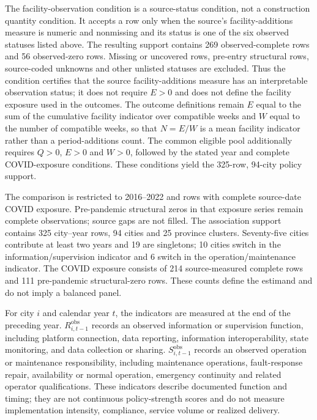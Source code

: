 The facility-observation condition is a source-status condition, not a
construction quantity condition.  It accepts a row only when the source's
facility-additions measure is numeric and nonmissing and its status is one of
the six observed statuses listed above.  The resulting support contains 269
observed-complete rows and 56 observed-zero rows.  Missing or uncovered rows,
pre-entry structural rows, source-coded unknowns and other unlisted statuses
are excluded.  Thus the condition certifies that the source facility-additions
measure has an interpretable observation status; it does not require $E>0$ and
does not define the facility exposure used in the outcomes.  The outcome
definitions remain $E$ equal to the sum of the cumulative facility indicator
over compatible weeks and $W$ equal to the number of compatible weeks, so that
$N=E/W$ is a mean facility indicator rather than a period-additions count.
The common eligible pool additionally requires $Q>0$, $E>0$ and $W>0$,
followed by the stated year and complete COVID-exposure conditions.  These
conditions yield the 325-row, 94-city policy support.

The comparison is restricted to 2016--2022 and rows with complete source-date
COVID exposure.  Pre-pandemic structural zeros in that exposure series remain
complete observations; source gaps are not filled.  The association support contains
325 city--year rows, 94 cities and 25 province clusters.  Seventy-five cities
contribute at least two years and 19 are singletons; 10 cities switch in the
information/supervision indicator and 6 switch in the operation/maintenance
indicator.  The COVID exposure consists of 214 source-measured complete rows and 111 pre-pandemic
structural-zero rows.  These counts define the estimand and do not imply a
balanced panel.

For city $i$ and calendar year $t$, the indicators are measured at the end of
the preceding year.  $R^{\mathrm{obs}}_{i,t-1}$ records an observed
information or supervision function, including platform connection, data
reporting, information interoperability, state monitoring, and data collection
or sharing.  $S^{\mathrm{obs}}_{i,t-1}$ records an observed operation or
maintenance responsibility, including maintenance operations, fault-response
repair, availability or normal operation, emergency continuity and related
operator qualifications.  These indicators describe documented function and
timing; they are not continuous policy-strength scores and do not measure
implementation intensity, compliance, service volume or realized delivery.

